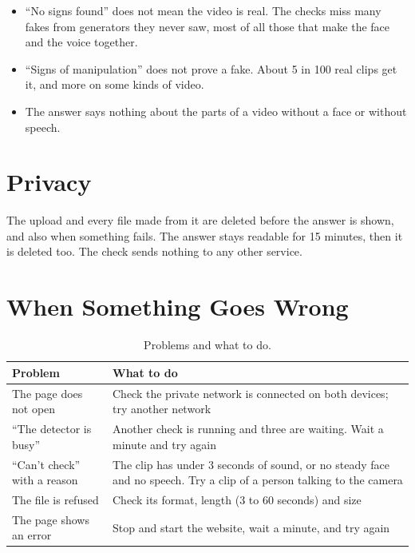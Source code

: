 \begin{itemize}
    \item ``No signs found'' does not mean the video is real. The checks miss
    many fakes from generators they never saw, most of all those that make the
    face and the voice together.
    \item ``Signs of manipulation'' does not prove a fake. About 5 in 100 real
    clips get it, and more on some kinds of video.
    \item The answer says nothing about the parts of a video without a face
    or without speech.
\end{itemize}

\section{Privacy}

The upload and every file made from it are deleted before the answer is
shown, and also when something fails. The answer stays readable for 15
minutes, then it is deleted too. The check sends nothing to any other
service.

\section{When Something Goes Wrong}

\begin{table}[ht]
    \centering
    \small
    \caption{Problems and what to do.}
    \label{tab:troubleshoot}
    \begin{tabularx}{\textwidth}{@{}>{\raggedright\arraybackslash}p{4.5cm}X@{}}
        \toprule
        \textbf{Problem} & \textbf{What to do} \\
        \midrule
        The page does not open & Check the private network is connected on both devices; try another network \\
        ``The detector is busy'' & Another check is running and three are waiting. Wait a minute and try again \\
        ``Can't check'' with a reason & The clip has under 3 seconds of sound, or no steady face and no speech. Try a clip of a person talking to the camera \\
        The file is refused & Check its format, length (3 to 60 seconds) and size \\
        The page shows an error & Stop and start the website, wait a minute, and try again \\
        \bottomrule
    \end{tabularx}
\end{table}

%





